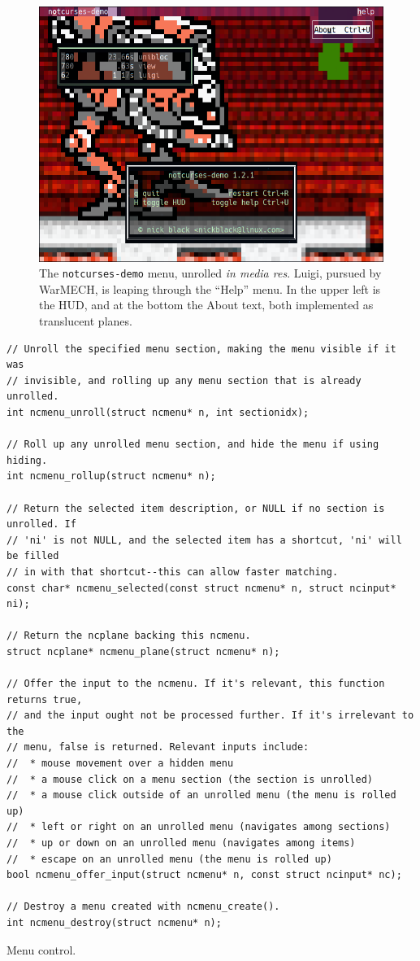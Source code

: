 \documentclass[letterpaper,10pt]{article}
\begin{document}
\begin{figure}
    \centering
    \includegraphics[width=.75\linewidth]{media/menuwarmech.png}
    \caption[WarMECH and a translucent menu.]{The \texttt{notcurses-demo} menu, unrolled \textit{in media res}. Luigi, pursued
      by WarMECH, is leaping through the ``Help'' menu. In the upper left is the HUD,
      and at the bottom the About text, both implemented as translucent planes.}
\end{figure}

\begin{listing}[!htb]
\begin{verbatim}
// Unroll the specified menu section, making the menu visible if it was
// invisible, and rolling up any menu section that is already unrolled.
int ncmenu_unroll(struct ncmenu* n, int sectionidx);

// Roll up any unrolled menu section, and hide the menu if using hiding.
int ncmenu_rollup(struct ncmenu* n);

// Return the selected item description, or NULL if no section is unrolled. If
// 'ni' is not NULL, and the selected item has a shortcut, 'ni' will be filled
// in with that shortcut--this can allow faster matching.
const char* ncmenu_selected(const struct ncmenu* n, struct ncinput* ni);

// Return the ncplane backing this ncmenu.
struct ncplane* ncmenu_plane(struct ncmenu* n);

// Offer the input to the ncmenu. If it's relevant, this function returns true,
// and the input ought not be processed further. If it's irrelevant to the
// menu, false is returned. Relevant inputs include:
//  * mouse movement over a hidden menu
//  * a mouse click on a menu section (the section is unrolled)
//  * a mouse click outside of an unrolled menu (the menu is rolled up)
//  * left or right on an unrolled menu (navigates among sections)
//  * up or down on an unrolled menu (navigates among items)
//  * escape on an unrolled menu (the menu is rolled up)
bool ncmenu_offer_input(struct ncmenu* n, const struct ncinput* nc);

// Destroy a menu created with ncmenu_create().
int ncmenu_destroy(struct ncmenu* n);
\end{verbatim}
\caption{Menu control.}
\end{listing}
\end{document}
